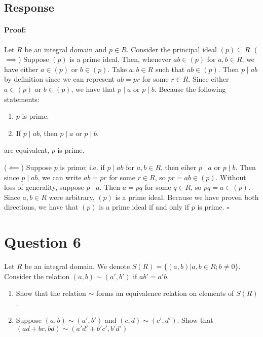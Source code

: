 \documentclass [12pt] {article}
\newenvironment{proof}{\paragraph{Proof:}}{\hfill$\square$}
\begin{document}
\subsection*{Response}
\begin{proof}
    Let $R$ be an integral domain and $p \in R$. Consider the principal ideal $(p) \subseteq R$.
    \newline
    ($\implies$)
    Suppose $(p)$ is a prime ideal. Then, whenever $ab \in (p)$ for $a, b \in R$, we have either
    $a \in (p)$ or $b \in (p)$. Take $a, b \in R$ such that $ab \in (p)$. Then $p \mid ab$ by definition
    since we can represent $ab = pr$ for some $r \in R$. Since either $a \in (p)$ or $b \in (p)$,
    we have that $p \mid a$ or $p \mid b$. Because the following statements:
    \begin{enumerate}
        \item $p$ is prime.
        \item If $p \mid ab$, then $p \mid a$ or $p \mid b$.
    \end{enumerate}
    are equivalent, $p$ is prime.
    \vspace{1em}

    ($\impliedby$)
    Suppose $p$ is prime; i.e. if $p \mid ab$ for $a, b \in R$, then eiher $p \mid a$ or $p \mid b$.
    Then since $p \mid ab$, we can write $ab = pr$ for some $r \in R$, so $pr = ab \in (p)$. Without
    loss of generality, suppose $p \mid a$. Then $a = pq$ for some $q \in R$, so $pq = a \in (p)$.
    Since $a, b \in R$ were arbitrary, $(p)$ is a prime ideal. Because we have proven both
    directions, we have that $(p)$ is a prime ideal if and only if $p$ is prime.
\end{proof}
\newpage


\section*{Question 6}
Let $R$ be an integral domain. We denote $S(R)=\{(a,b)|a,b\in R;b\neq 0\}$. Consider the relation
$(a,b)\sim (a',b')$ if $ab'=a'b$.
\begin{enumerate}
    \item Show that the relation $\sim$ forms an equivalence relation on elements of $S(R)$.
    \item Suppose $(a,b)\sim (a',b')$ and $(c,d)\sim (c',d')$. Show that
        $(ad+bc,bd)\sim (a'd'+b'c',b'd')$
\end{enumerate}
\end{document}
